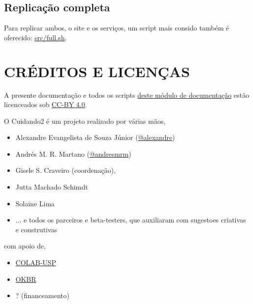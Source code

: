 \documentclass[letterpaper,10pt,english]{sphinxmanual}
\begin{document}
\section{Replicação completa}
\label{index:replicacao-completa}
Para replicar ambos, o site e os serviços, um script mais consido também
é oferecido: \href{https://github.com/okfn-brasil/cuidando2-doc/blob/master/src/full.sh}{src/full.sh}.


\chapter{CRÉDITOS E LICENÇAS}
\label{index:creditos-e-licencas}
A presente documentação e todos os scripts \href{https://github.com/okfn-brasil/cuidando2-doc}{deste módulo de
documentação} estão
licenceados sob \href{http://creativecommons.org/licenses/by/4.0/}{CC-BY 4.0}.

O Cuidando2 é um projeto realizado por várias mãos,
\begin{itemize}
\item {} 
Alexandre Evangelista de Souza Júnior
(\href{https://github.com/alexandre}{@alexandre})

\item {} 
Andrés M. R. Martano (\href{https://github.com/andresmrm}{@andresmrm})

\item {} 
Gisele S. Craveiro (coordenação),

\item {} 
Jutta Machado Schimdt

\item {} 
Solaine Lima

\item {} 
... e todos os parceiros e beta-testers, que  auxiliaram com sugestoes criativas e construtivas

\end{itemize}

com apoio de,
\begin{itemize}
\item {} 
\href{http://colab.each.usp.br/}{COLAB-USP}

\item {} 
\href{http://br.okfn.org/}{OKBR}

\item {} 
? (financeamento)

\end{itemize}
\end{document}

